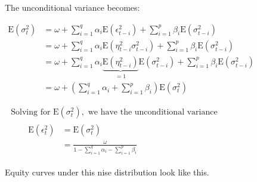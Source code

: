 \documentclass[11pt]{article}
\begin{document}
The unconditional variance becomes:

\(\begin{aligned} \mathrm{E}\left(\sigma_{t}^{2}\right) &=\omega+\sum_{i=1}^{q} \alpha_{i} \mathrm{E}\left(\epsilon_{t-i}^{2}\right)+\sum_{i=1}^{p} \beta_{i} \mathrm{E}\left(\sigma_{t-i}^{2}\right) \\ &=\omega+\sum_{i=1}^{q} \alpha_{i} \mathrm{E}\left(\eta_{t-i}^{2} \sigma_{t-i}^{2}\right)+\sum_{i=1}^{p} \beta_{i} \mathrm{E}\left(\sigma_{t-i}^{2}\right) \\ &=\omega+\sum_{i=1}^{q} \alpha_{i} \underbrace{\mathrm{E}\left(\eta_{t-i}^{2}\right)}_{=1} \mathrm{E}\left(\sigma_{t-i}^{2}\right)+\sum_{i=1}^{p} \beta_{i} \mathrm{E}\left(\sigma_{t-i}^{2}\right) \\ &=\omega+\left(\sum_{i=1}^{q} \alpha_{i}+\sum_{i=1}^{p} \beta_{i}\right) \mathrm{E}\left(\sigma_{t}^{2}\right) \end{aligned}\)

\(\begin{array}{l}{\text { Solving for } \mathrm{E}\left(\sigma_{t}^{2}\right), \text { we have the unconditional variance }} \\ {\qquad \begin{aligned} \mathrm{E}\left(\epsilon_{t}^{2}\right) &=\mathrm{E}\left(\sigma_{t}^{2}\right) \\ &=\frac{\omega}{1-\sum_{i=1}^{q} \alpha_{i}-\sum_{i=1}^{p} \beta_{i}} \end{aligned}}\end{array}\)

Equity curves under this nise distribution look like this.
\end{document}
